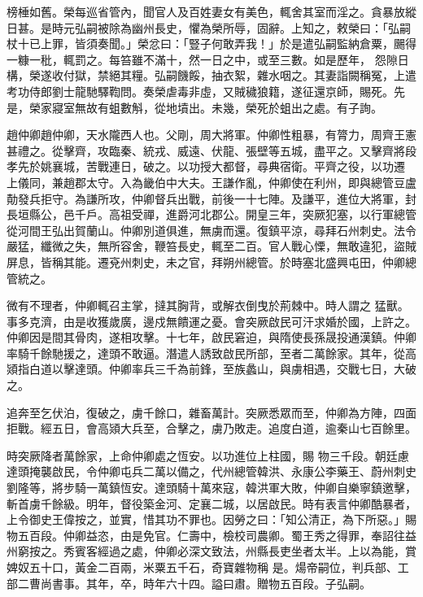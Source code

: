\begin{pinyinscope}
 榜棰如舊。榮每巡省管內，聞官人及百姓妻女有美色，輒舍其室而淫之。貪暴放縱日甚。是時元弘嗣被除為幽州長史，懼為榮所辱，固辭。上知之，敕榮曰：「弘嗣杖十已上罪，皆須奏聞。」榮忿曰：「豎子何敢弄我！」於是遣弘嗣監納倉粟，颺得一糠一秕，輒罰之。每笞雖不滿十，然一日之中，或至三數。如是歷年，
 怨隙日構，榮遂收付獄，禁絕其糧。弘嗣饑餒，抽衣絮，雜水咽之。其妻詣闕稱冤，上遣考功侍郎劉士龍馳驛鞫問。奏榮虐毒非虛，又賊穢狼籍，遂征還京師，賜死。先是，榮家寢室無故有蛆數斛，從地墳出。未幾，榮死於蛆出之處。有子詢。



 趙仲卿趙仲卿，天水隴西人也。父剛，周大將軍。仲卿性粗暴，有膂力，周齊王憲甚禮之。從擊齊，攻臨秦、統戎、威遠、伏龍、張壁等五城，盡平之。又擊齊將段孝先於姚襄城，苦戰連日，破之。以功授大都督，尋典宿衛。平齊之役，以功遷
 上儀同，兼趙郡太守。入為畿伯中大夫。王謙作亂，仲卿使在利州，即與總管豆盧勣發兵拒守。為謙所攻，仲卿督兵出戰，前後一十七陣。及謙平，進位大將軍，封長垣縣公，邑千戶。高祖受禪，進爵河北郡公。開皇三年，突厥犯塞，以行軍總管從河間王弘出賀蘭山。仲卿別道俱進，無虜而還。復鎮平涼，尋拜石州刺史。法令嚴猛，纖微之失，無所容舍，鞭笞長史，輒至二百。官人戰心慄，無敢違犯，盜賊屏息，皆稱其能。遷兗州刺史，未之官，拜朔州總管。於時塞北盛興屯田，仲卿總管統之。



 微有不理者，仲卿輒召主掌，撻其胸背，或解衣倒曳於荊棘中。時人謂之
 猛獸。事多克濟，由是收獲歲廣，邊戍無饋運之憂。會突厥啟民可汗求婚於國，上許之。仲卿因是間其骨肉，遂相攻擊。十七年，啟民窘迫，與隋使長孫晟投通漢鎮。仲卿率騎千餘馳援之，達頭不敢逼。潛遣人誘致啟民所部，至者二萬餘家。其年，從高熲指白道以擊達頭。仲卿率兵三千為前鋒，至族蠡山，與虜相遇，交戰七日，大破之。



 追奔至乞伏泊，復破之，虜千餘口，雜畜萬計。突厥悉眾而至，仲卿為方陣，四面拒戰。經五日，會高熲大兵至，合擊之，虜乃敗走。追度白道，逾秦山七百餘里。



 時突厥降者萬餘家，上命仲卿處之恆安。以功進位上柱國，賜
 物三千段。朝廷慮達頭掩襲啟民，令仲卿屯兵二萬以備之，代州總管韓洪、永康公李藥王、蔚州刺史劉隆等，將步騎一萬鎮恆安。達頭騎十萬來寇，韓洪軍大敗，仲卿自樂寧鎮邀擊，斬首虜千餘級。明年，督役築金河、定襄二城，以居啟民。時有表言仲卿酷暴者，上令御史王偉按之，並實，惜其功不罪也。因勞之曰：「知公清正，為下所惡。」賜物五百段。仲卿益恣，由是免官。仁壽中，檢校司農卿。蜀王秀之得罪，奉詔往益州窮按之。秀賓客經過之處，仲卿必深文致法，州縣長吏坐者太半。上以為能，賞婢奴五十口，黃金二百兩，米粟五千石，奇寶雜物稱
 是。煬帝嗣位，判兵部、工部二曹尚書事。其年，卒，時年六十四。謚曰肅。贈物五百段。子弘嗣。




\end{pinyinscope}
